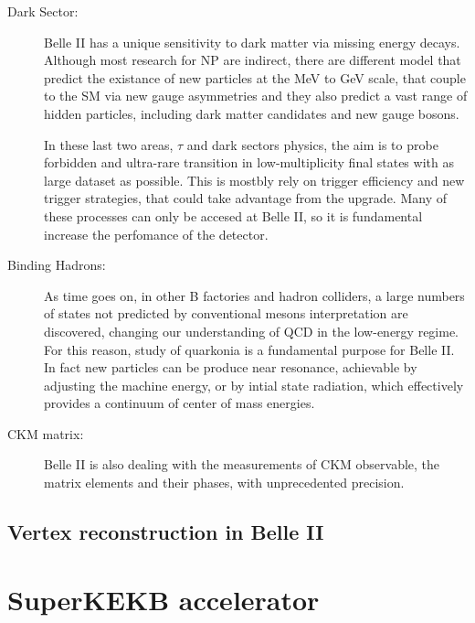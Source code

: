 \begin{description}
\item[Dark Sector:] Belle II has a unique sensitivity to dark matter via missing energy decays. Although most research for NP are indirect, there are different model that predict the existance of new particles at the MeV to GeV scale, that couple to the SM via new gauge asymmetries and they also predict a vast range of hidden particles, including dark matter candidates and new gauge bosons.

In these last two areas, $\tau$ and dark sectors physics, the aim is to probe forbidden and ultra-rare transition in low-multiplicity final states with as large dataset as possible. This is mostbly rely on trigger efficiency and new trigger strategies, that could take advantage from the upgrade. Many of these processes can only be accesed at Belle II, so it is fundamental increase the perfomance of the detector.

\item[Binding Hadrons:] As time goes on, in other B factories and hadron colliders, a large numbers of states not predicted by conventional mesons interpretation are discovered, changing our understanding of QCD in the low-energy regime. For this reason, study of quarkonia is a fundamental purpose for Belle II. In fact new particles can be produce near resonance, achievable by adjusting the machine energy, or by intial state radiation, which effectively provides a continuum of center of mass energies. 

\item[CKM matrix:] Belle II is also dealing with the measurements of CKM observable, the matrix elements and their phases, with unprecedented precision. 

\end{description}


\subsection{Vertex reconstruction in Belle II}


\newpage





\section{SuperKEKB accelerator}

